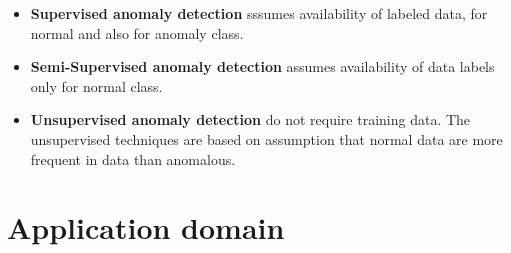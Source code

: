 \begin{itemize}
	\item \textbf{Supervised anomaly detection} sssumes availability of labeled data, for normal
	and also for anomaly class. %
	\item \textbf{Semi-Supervised anomaly detection} assumes availability of data labels only for
	normal class. %
	\item \textbf{Unsupervised anomaly detection} do not require training data. The unsupervised 
	techniques are based on assumption that normal data are more frequent in data than anomalous.	
\end{itemize}

\section{Application domain}

